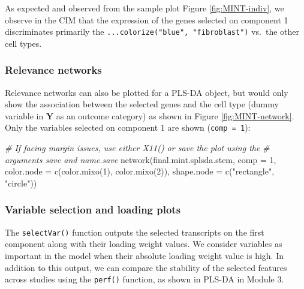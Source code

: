 \documentclass[
]{book}
\newenvironment{Shaded}{\begin{snugshade}}{\end{snugshade}}
\newcommand{\AttributeTok}[1]{\textcolor[rgb]{0.77,0.63,0.00}{#1}}
\newcommand{\CommentTok}[1]{\textcolor[rgb]{0.56,0.35,0.01}{\textit{#1}}}
\newcommand{\DecValTok}[1]{\textcolor[rgb]{0.00,0.00,0.81}{#1}}
\newcommand{\FunctionTok}[1]{\textcolor[rgb]{0.00,0.00,0.00}{#1}}
\newcommand{\NormalTok}[1]{#1}
\newcommand{\StringTok}[1]{\textcolor[rgb]{0.31,0.60,0.02}{#1}}
\begin{document}
As expected and observed from the sample plot Figure \ref{fig:MINT-indiv}, we observe in the CIM that the expression of the genes selected on component 1 discriminates primarily the \texttt{...colorize("blue",\ "fibroblast")} vs.~the other cell types.

\hypertarget{relevance-networks}{%
\subsubsection{Relevance networks}\label{relevance-networks}}

Relevance networks can also be plotted for a PLS-DA object, but would only show the association between the selected genes and the cell type (dummy variable in \(\boldsymbol Y\) as an outcome category) as shown in Figure \ref{fig:MINT-network}. Only the variables selected on component 1 are shown (\texttt{comp\ =\ 1}):

\begin{Shaded}
\begin{Highlighting}[]
\CommentTok{\# If facing margin issues, use either X11() or save the plot using the}
\CommentTok{\# arguments save and name.save}
\FunctionTok{network}\NormalTok{(final.mint.splsda.stem, }\AttributeTok{comp =} \DecValTok{1}\NormalTok{,}
        \AttributeTok{color.node =} \FunctionTok{c}\NormalTok{(}\FunctionTok{color.mixo}\NormalTok{(}\DecValTok{1}\NormalTok{), }\FunctionTok{color.mixo}\NormalTok{(}\DecValTok{2}\NormalTok{)), }
        \AttributeTok{shape.node =} \FunctionTok{c}\NormalTok{(}\StringTok{"rectangle"}\NormalTok{, }\StringTok{"circle"}\NormalTok{))}
\end{Highlighting}
\end{Shaded}



\hypertarget{variable-selection-and-loading-plots}{%
\subsubsection{Variable selection and loading plots}\label{variable-selection-and-loading-plots}}

The \texttt{selectVar()} function outputs the selected transcripts on the first component along with their loading weight values. We consider variables as important in the model when their absolute loading weight value is high. In addition to this output, we can compare the stability of the selected features across studies using the \texttt{perf()} function, as shown in PLS-DA in Module 3.
\end{document}
